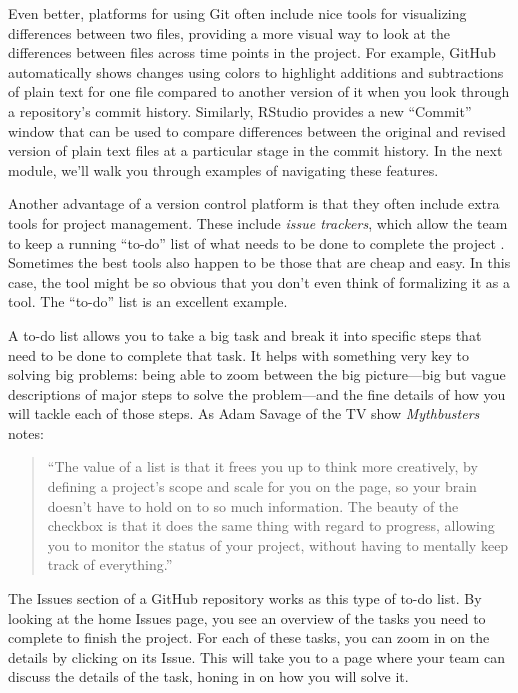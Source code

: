 \documentclass[]{tufte-book}
\begin{document}
Even better, platforms for using Git often include nice tools for visualizing
differences between two files, providing a more visual way to look at the
differences between files across time points in the project. For example, GitHub
automatically shows changes using colors to highlight additions and subtractions
of plain text for one file compared to another version of it when you look
through a repository's commit history. Similarly, RStudio provides a new
``Commit'' window that can be used to compare differences between the original and
revised version of plain text files at a particular stage in the commit history.
In the next module, we'll walk you through examples of navigating these features.

Another advantage of a version control platform is that they often include extra
tools for project management. These include \emph{issue trackers}, which allow the
team to keep a running ``to-do'' list of what needs to be done to complete the
project \citep{perez2016ten}. Sometimes the best tools also happen to be those that
are cheap and easy. In this case, the tool might be so obvious that you don't
even think of formalizing it as a tool. The ``to-do'' list is an excellent
example.

A to-do list allows you to take a big task and break it into specific steps
that need to be done to complete that task. It helps with something very key
to solving big problems: being able to zoom between the big picture---big
but vague descriptions of major steps to solve the problem---and the fine
details of how you will tackle each of those steps. As Adam Savage of
the TV show \emph{Mythbusters} notes:

\begin{quote}
``The value of a list is that it frees you up to think more creatively, by
defining a project's scope and scale for you on the page, so your brain doesn't
have to hold on to so much information. The beauty of the checkbox is that it
does the same thing with regard to progress, allowing you to monitor the status
of your project, without having to mentally keep track of everything.'' \citep{savage2020every}
\end{quote}

The Issues section of a GitHub repository works as this type of to-do list. By
looking at the home Issues page, you see an overview of the tasks you need to
complete to finish the project. For each of these tasks, you can zoom in on
the details by clicking on its Issue. This will take you to a page where your
team can discuss the details of the task, honing in on how you will solve it.
\end{document}
